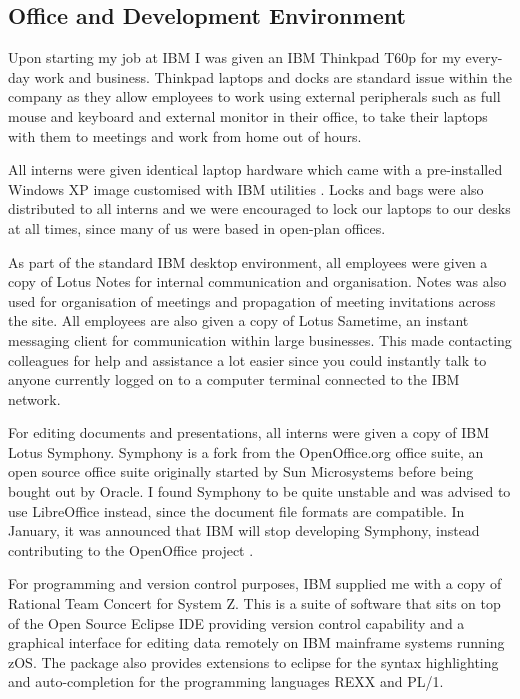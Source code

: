 \documentclass[12pt,a4paper]{article}
\begin{document}
\subsection{Office and Development Environment}
Upon starting my job at IBM I was given an IBM Thinkpad T60p for my every-day
work and business. Thinkpad laptops and docks are standard issue within the
company as they allow employees to work using external peripherals such as
full mouse and keyboard and external monitor in their office, to take their
laptops with them to meetings and work from home out of hours.

All interns were given identical laptop hardware which came with a pre-installed
Windows XP image customised with IBM utilities . Locks and bags were also
distributed to all interns and we were encouraged to lock our laptops to our
desks at all times, since many of us were based in open-plan offices. 

As part of the standard IBM desktop environment, all employees were given a copy
of Lotus Notes for internal communication and organisation. Notes was also used
for organisation of meetings and propagation of meeting invitations across the
site. All employees are also given a copy of Lotus Sametime, an instant
messaging client for communication within large businesses. This made contacting
colleagues for help and assistance a lot easier since you could instantly talk
to anyone currently logged on to a computer terminal connected to the IBM
network.

For editing documents and presentations, all interns were given a copy of IBM 
Lotus Symphony. Symphony is a fork from the OpenOffice.org office suite, an open
source office suite originally started by Sun Microsystems before being bought
out by Oracle. I found Symphony to be quite unstable and was advised to use 
LibreOffice instead, since the document file formats are compatible. In January,
it was announced that IBM will stop developing Symphony, instead contributing to
the OpenOffice project \cite{SunsetSymphony}.

For programming and version control purposes, IBM supplied me with a copy of
Rational Team Concert for System Z. This is a suite of software that sits on top
of the Open Source Eclipse IDE providing version control capability and a
graphical interface for editing data remotely on IBM mainframe systems running
zOS. The package also provides extensions to eclipse for the syntax highlighting
and auto-completion for the programming languages REXX and PL/1.
\end{document}
